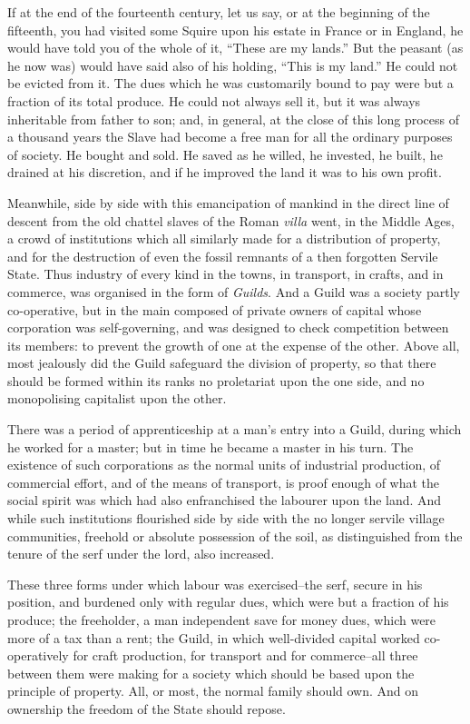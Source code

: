 \documentclass{book}
\begin{document}
If at the end of the fourteenth century, let us say, or at the beginning of the fifteenth, you had visited some Squire upon his estate in France or in England, he would have told you of the whole of it, “These are my lands.” But the peasant (as he now was) would have said also of his holding, “This is my land.” He could not be evicted from it. The dues which he was customarily bound to pay were but a fraction of its total produce. He could not always sell it, but it was always inheritable from father to son; and, in general, at the close of this long process of a thousand years the Slave had become a free man for all the ordinary purposes of society. He bought and sold. He saved as he willed, he invested, he built, he drained at his discretion, and if he improved the land it was to his own profit.

Meanwhile, side by side with this emancipation of mankind in the direct line of descent from the old chattel slaves of the Roman \emph{villa} went, in the Middle Ages, a crowd of institutions which all similarly made for a distribution of property, and for the destruction of even the fossil remnants of a then forgotten Servile State. Thus industry of every kind in the towns, in transport, in crafts, and in commerce, was organised in the form of \emph{Guilds}. And a Guild was a society partly co-operative, but in the main composed of private owners of capital whose corporation was self-governing, and was designed to check competition between its members: to prevent the growth of one at the expense of the other. Above all, most jealously did the Guild safeguard the division of property, so that there should be formed within its ranks no proletariat upon the one side, and no monopolising capitalist upon the other.

There was a period of apprenticeship at a man’s entry into a Guild, during which he worked for a master; but in time he became a master in his turn. The existence of such corporations as the normal units of industrial production, of commercial effort, and of the means of transport, is proof enough of what the social spirit was which had also enfranchised the labourer upon the land. And while such institutions flourished side by side with the no longer servile village communities, freehold or absolute possession of the soil, as distinguished from the tenure of the serf under the lord, also increased.

These three forms under which labour was exercised–the serf, secure in his position, and burdened only with regular dues, which were but a fraction of his produce; the freeholder, a man independent save for money dues, which were more of a tax than a rent; the Guild, in which well-divided capital worked co-operatively for craft production, for transport and for commerce–all three between them were making for a society which should be based upon the principle of property. All, or most, the normal family should own. And on ownership the freedom of the State should repose.
\end{document}
